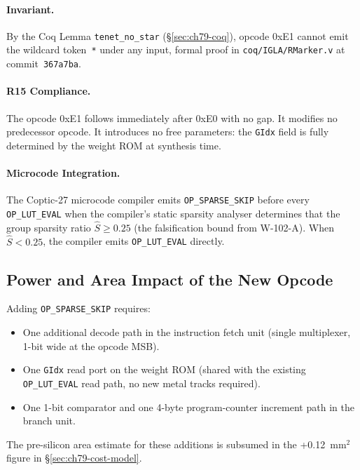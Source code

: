 \paragraph{Invariant.}
By the Coq Lemma \texttt{tenet\_no\_star}
(§\ref{sec:ch79-coq}), opcode 0xE1 cannot emit the wildcard
token~\texttt{*} under any input, formal proof in
\texttt{coq/IGLA/RMarker.v} at commit~\texttt{367a7ba}.

\paragraph{R15 Compliance.}
The opcode 0xE1 follows immediately after 0xE0 with no gap.
It modifies no predecessor opcode.
It introduces no free parameters: the \texttt{GIdx} field is
fully determined by the weight ROM at synthesis time.

\paragraph{Microcode Integration.}
The Coptic-27 microcode compiler emits \texttt{OP\_SPARSE\_SKIP}
before every \texttt{OP\_LUT\_EVAL} when the compiler's static
sparsity analyser determines that the group sparsity ratio
$\hat{S} \geq 0.25$ (the falsification bound from W-102-A).
When $\hat{S} < 0.25$, the compiler emits \texttt{OP\_LUT\_EVAL}
directly.

\subsection{Power and Area Impact of the New Opcode}
\label{subsec:ch79-opcode-impact}

Adding \texttt{OP\_SPARSE\_SKIP} requires:

\begin{itemize}
  \item One additional decode path in the instruction fetch unit
        (single multiplexer, 1-bit wide at the opcode MSB).
  \item One \texttt{GIdx} read port on the weight ROM (shared with the
        existing \texttt{OP\_LUT\_EVAL} read path, no new metal tracks
        required).
  \item One 1-bit comparator and one 4-byte program-counter increment
        path in the branch unit.
\end{itemize}

The pre-silicon area estimate for these additions is subsumed in the
+0.12~mm$^2$ figure in §\ref{sec:ch79-cost-model}.


